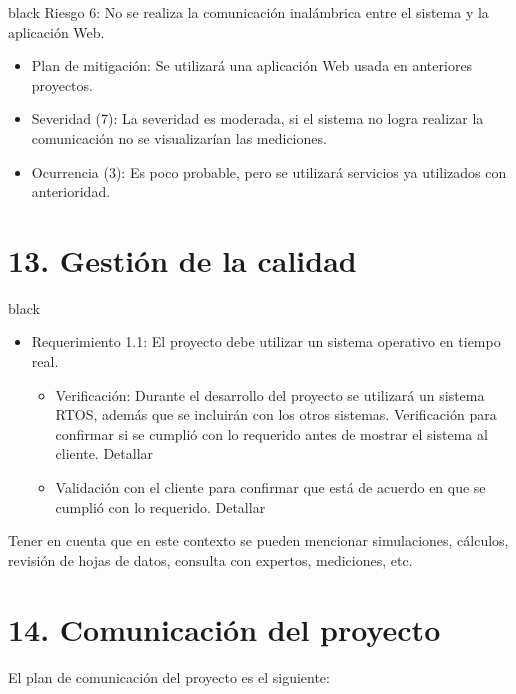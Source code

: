 \documentclass[11pt]{charter}
\begin{document}
\begin{consigna}{black}
Riesgo 6: No se realiza la comunicación inalámbrica entre el sistema y la aplicación Web.
\begin{itemize}
\item Plan de mitigación: Se utilizará una aplicación Web usada en anteriores proyectos. 
\item Severidad (7): La severidad es moderada, si el sistema no logra realizar la comunicación no se visualizarían las mediciones.
\item Ocurrencia (3): Es poco probable, pero se utilizará servicios ya utilizados con anterioridad.
\end{itemize}

\end{consigna}


\section{13. Gestión de la calidad}
\label{sec:calidad}

\begin{consigna}{black}
\begin{itemize} 
\item Requerimiento 1.1: El proyecto debe utilizar un sistema operativo en tiempo real.
\begin{itemize}
\item Verificación: Durante el desarrollo del proyecto se utilizará un sistema RTOS, además que se incluirán con los otros sistemas. 
Verificación para confirmar si se cumplió con lo requerido antes de mostrar el sistema al cliente. Detallar 
\item Validación con el cliente para confirmar que está de acuerdo en que se cumplió con lo requerido. Detallar  
\end{itemize}



\end{itemize}

Tener en cuenta que en este contexto se pueden mencionar simulaciones, cálculos, revisión de hojas de datos, consulta con expertos, mediciones, etc.

\end{consigna}

\section{14. Comunicación del proyecto}
\label{sec:comunicaciones}

El plan de comunicación del proyecto es el siguiente:
\end{document}
